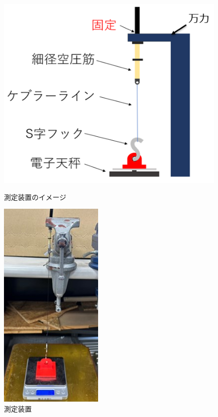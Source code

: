 \begin{figure}[h]
  \begin{minipage}[b]{0.49\columnwidth}
    \vspace{4mm}
    \centering
    \includegraphics[scale=0.5]{pic/souti.PNG}
  
    \caption{測定装置のイメージ}
    \label{fig:souti}
  \end{minipage}
  \begin{minipage}[b]{0.49\columnwidth}
    \vspace{8mm}
    \centering
    \includegraphics[scale=0.5]{pic/new.jpg}
    \caption{測定装置}
    \label{fig:souti2}
  \end{minipage}
\end{figure}
